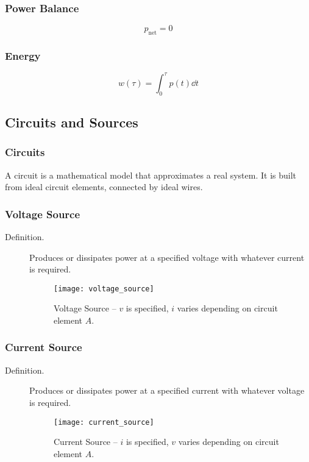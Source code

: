\documentclass{article}
\begin{document}
\subsubsection{Power Balance}
\begin{theorem}
    \begin{equation*}
        p_{\text{net}} = 0
    \end{equation*}
\end{theorem}
\subsubsection{Energy}
\begin{theorem}
    \begin{equation*}
        w\left( \tau \right) = \int_0^\tau p\left( t \right) \dd{t}
    \end{equation*}
\end{theorem}
\subsection{Circuits and Sources}
\subsubsection{Circuits}
\begin{definition}
    A circuit is a mathematical model that approximates a real system. It is built from ideal circuit elements, connected by ideal wires. 
\end{definition}
\subsubsection{Voltage Source}
\begin{description}
    \item[Definition.] Produces or dissipates power at a specified voltage with whatever current is required. 
    \begin{figure}[H]
        \centering
        \texttt{[image: voltage\_source]}
        \caption{Voltage Source -- $v$ is specified, $i$ varies depending on circuit element $A$.}
    \end{figure}
\end{description}
\subsubsection{Current Source}
\begin{description}
    \item[Definition.] Produces or dissipates power at a specified current with whatever voltage is required. 
    \begin{figure}[H]
        \centering
        \texttt{[image: current\_source]}
        \caption{Current Source -- $i$ is specified, $v$ varies depending on circuit element $A$.}
    \end{figure}
\end{description}
\end{document}
